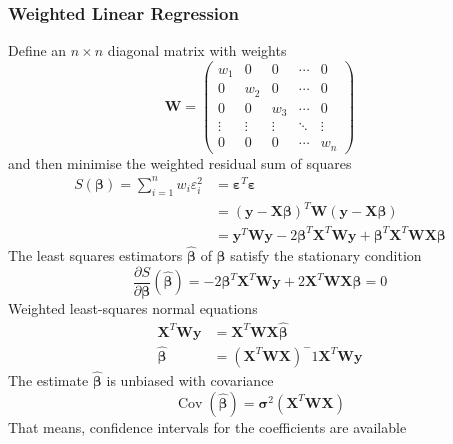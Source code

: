 \documentclass[11pt]{article}
\theoremstyle{definition}
\newcommand*\Cov[1]{\mathop{\text{Cov}}\left(#1\right)}
\begin{document}
\subsubsection{Weighted Linear Regression}
Define an $n\times n$ diagonal matrix with weights
\begin{equation*}
	\bm{W} = \begin{pmatrix}
		w_1 & 0 & 0 & \cdots & 0\\
		0 & w_2 & 0 & \cdots & 0\\
		0 & 0 & w_3 & \cdots & 0\\
		\vdots & \vdots & \vdots & \ddots & \vdots\\
		0 & 0 & 0 & \cdots & w_n
	\end{pmatrix}
\end{equation*}
and then minimise the weighted residual sum of squares
\begin{align*}
	S(\bm{\beta}) = \sum_{i=1}^{n}w_i\varepsilon_i^2 &= \bm{\varepsilon}^T\bm{\varepsilon}\\
	&= (\bm{y}-\bm{X\beta})^T\bm{W}(\bm{y}-\bm{X\beta})\\
	&= \bm{y}^T\bm{Wy} - 2\bm{\beta}^T\bm{X}^T\bm{Wy} + \bm{\beta}^T\bm{X}^T\bm{WX\beta}
\end{align*}
The least squares estimators $\hat{\bm{\beta}}$ of $\bm{\beta}$ satisfy the stationary condition
\begin{equation*}
	\frac{\partial S}{\partial\bm{\beta}}(\hat{\bm{\beta}}) = -  2\bm{\beta}^T\bm{X}^T\bm{Wy} + 2\bm{X}^T\bm{WX}\hat{\bm{\beta}} = 0
\end{equation*}
Weighted least-squares normal equations
\begin{align*}
	\bm{X}^T\bm{Wy} &= \bm{X}^T\bm{WX}\hat{\bm{\beta}}\\
	\hat{\bm{\beta}} &= \left(\bm{X}^T\bm{WX}\right)^-1\bm{X}^T\bm{Wy}
\end{align*}
The estimate $\hat{\bm{\beta}}$ is unbiased with covariance
\begin{equation*}
	\Cov{\hat{\bm{\beta}}} = \bm{\sigma}^2\left(\bm{X}^T\bm{WX}\right)
\end{equation*}
That means, confidence intervals for the coefficients are available
\end{document}
